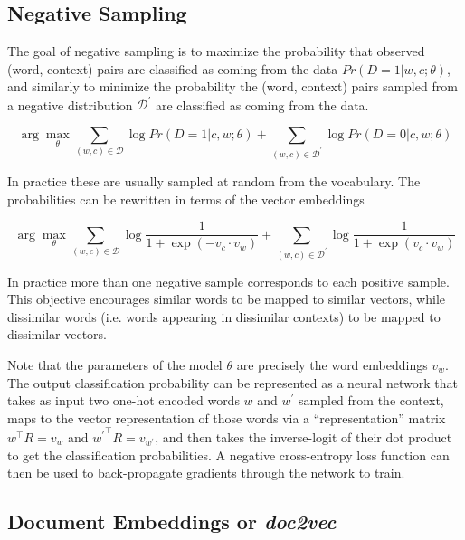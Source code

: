 \subsection{Negative Sampling}

The goal of negative sampling is to maximize the probability that observed (word, context) pairs are classified as coming from the data $Pr(D=1 | w, c ; \theta)$, and similarly to minimize the probability the (word, context) pairs sampled from a negative distribution $\mathcal{D^\prime}$ are classified as coming from the data.

\begin{equation*}
\arg\max_\theta \sum_{(w, c) \in \mathcal{D}} \log Pr(D = 1 | c, w ; \theta)
+ \sum_{(w, c) \in \mathcal{D^\prime}} \log Pr(D = 0 | c, w ; \theta)
\end{equation*}

In practice these are usually sampled at random from the vocabulary. The probabilities can be rewritten in terms of the vector embeddings

\begin{equation*}
\arg\max_\theta
\sum_{(w, c) \in \mathcal{D}}
    \log \dfrac{1}{1 + \exp{(-v_c \cdot v_w)}}
+ \sum_{(w, c) \in \mathcal{D^\prime}}
    \log \dfrac{1}{1 + \exp{(v_c \cdot v_w)}}
\end{equation*}

In practice more than one negative sample corresponds to each positive sample. This objective encourages similar words to be mapped to similar vectors, while dissimilar words (i.e. words appearing in dissimilar contexts) to be mapped to dissimilar vectors.

Note that the parameters of the model $\theta$ are precisely the word embeddings $v_w$. The output classification probability can be represented as a neural network that takes as input two one-hot encoded words $w$ and $w^\prime$ sampled from the context, maps to the vector representation of those words via a ``representation'' matrix $w^\top R = v_w$ and ${w^\prime}^\top R = v_{w^\prime}$, and then takes the inverse-logit of their dot product to get the classification probabilities. A negative cross-entropy loss function can then be used to back-propagate gradients through the network to train.

\subsection{Document Embeddings or \textit{doc2vec}}

